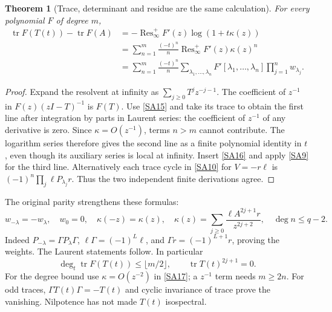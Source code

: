 \documentclass[11pt]{article}
\newcommand{\tr}{\operatorname{tr}}\newcommand{\Res}{\operatorname{Res}}
\newtheorem{theorem}{Theorem}[section]
\begin{document}
\begin{theorem}[Trace, determinant and residue are the same calculation]
For every polynomial $F$ of degree $m$,
\begin{equation}\tag{SA17}\label{SA17}
\begin{split}
\tr F(T(t))-\tr F(A)
&=-\Res_\infty^+ F'(z)\log(1+t\kappa(z))\\
&=\sum_{n=1}^{m}\frac{(-t)^n}{n}
\Res_\infty^+ F'(z)\kappa(z)^n\\
&=\sum_{n=1}^{m}\frac{(-t)^n}{n}
\sum_{\lambda_1,\ldots,\lambda_n}
F'[\lambda_1,\ldots,\lambda_n]\prod_{j=1}^n w_{\lambda_j}.
\end{split}
\end{equation}
\end{theorem}
\begin{proof}
Expand the resolvent at infinity as
$\sum_{j\geq0}T^jz^{-j-1}$. The coefficient of $z^{-1}$
in $F(z)(zI-T)^{-1}$ is $F(T)$.
Use \eqref{SA15} and take its trace to obtain the first
line after integration by parts in Laurent series:
the coefficient of $z^{-1}$ of any derivative is zero.
Since $\kappa=O(z^{-1})$, terms $n>m$ cannot contribute.
The logarithm series therefore gives the second line
as a finite polynomial identity in $t$, even though its
auxiliary series is local at infinity. Insert
\eqref{SA16} and apply \eqref{SA9} for the third line.
Alternatively each trace cycle in \eqref{SA10} for
$V=-r\ell$ is $(-1)^n\prod_j\ell P_{\lambda_j}r$.
Thus the two independent finite derivations agree.
\end{proof}

The original parity strengthens these formulas:
\begin{equation}\tag{SA18}\label{SA18}
w_{-\lambda}=-w_\lambda,\quad w_0=0,\quad
\kappa(-z)=\kappa(z),\quad
\kappa(z)=\sum_{j\geq0}\frac{\ell A^{2j+1}r}{z^{2j+2}},
\quad \deg n\leq q-2.
\end{equation}
Indeed $P_{-\lambda}=\Gamma P_\lambda\Gamma$,
$\ell\Gamma=(-1)^L\ell$, and
$\Gamma r=(-1)^{L+1}r$, proving the weights.
The Laurent statements follow. In particular
\begin{equation}\tag{SA19}\label{SA19}
\deg_t\tr F(T(t))\leq\lfloor m/2\rfloor,\qquad
\tr T(t)^{2j+1}=0.
\end{equation}
For the degree bound use $\kappa=O(z^{-2})$ in
\eqref{SA17}; a $z^{-1}$ term needs $m\geq2n$.
For odd traces, $\Gamma T(t)\Gamma=-T(t)$ and cyclic
invariance of trace prove the vanishing. Nilpotence
has not made $T(t)$ isospectral.
\end{document}
